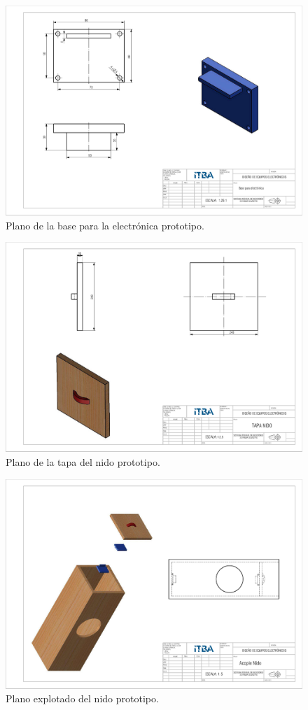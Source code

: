 \begin{figure}[H]
	\centering
	\includegraphics[width=\linewidth]{ImagenesApendice/Base_electronica_plano}
	\caption{Plano de la base para la electr\'onica prototipo.}
	\label{fig:base_electronica_plano}
\end{figure}

\begin{figure}[H]
	\centering
	\includegraphics[width=\linewidth]{ImagenesApendice/tapa_nido_plano}
	\caption{Plano de la tapa del nido prototipo.}
	\label{fig:tapa_nido_plano}
\end{figure}

\begin{figure}[H]
	\centering
	\includegraphics[width=\linewidth]{ImagenesApendice/explotado_nido}
	\caption{Plano explotado del nido prototipo.}
	\label{fig:explotado_nido_plano}
\end{figure}

